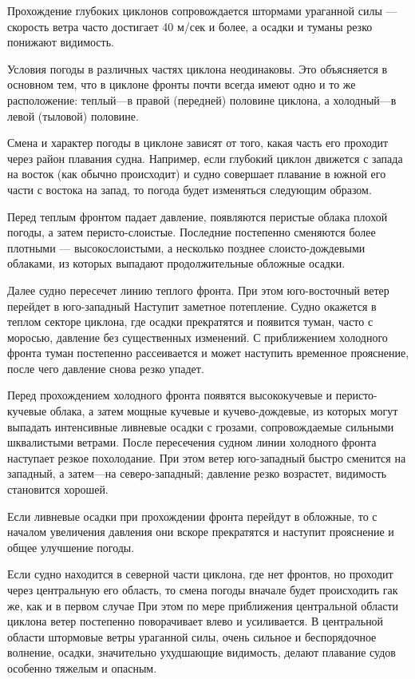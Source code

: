 Прохождение глубоких циклонов сопровождается штормами ураганной силы — скорость ветра часто достигает 40 м/сек и более, а осадки и туманы резко понижают видимость.

Условия погоды в различных частях циклона неодинаковы. Это объясняется в основном тем, что в циклоне фронты почти всегда имеют одно и то же расположение: теплый—в правой (передней) половине циклона, а холодный—в левой (тыловой) половине.

Смена и характер погоды в циклоне зависят от того, какая часть его проходит через район плавания судна. Например, если глубокий циклон движется с запада на восток (как обычно происходит) и судно совершает плавание в южной его части с востока на запад, то погода будет изменяться следующим образом.

Перед теплым фронтом падает давление, появляются перистые облака плохой погоды, а затем перисто-слоистые. Последние постепенно сменяются более плотными — высокослоистыми, а несколько позднее слоисто-дождевыми облаками, из которых выпадают продолжительные обложные осадки.

Далее судно пересечет линию теплого фронта. При этом юго-восточный ветер перейдет в юго-западный Наступит заметное потепление. Судно окажется в теплом секторе циклона, где осадки прекратятся и появится туман, часто с моросью, давление без существенных изменений. С приближением холодного фронта туман постепенно рассеивается и может наступить временное прояснение, после чего давление снова резко упадет.

Перед прохождением холодного фронта появятся высококучевые и перисто-кучевые облака, а затем мощные кучевые и кучево-дождевые, из которых могут выпадать интенсивные ливневые осадки с грозами, сопровождаемые сильными шквалистыми ветрами. После пересечения судном линии холодного фронта наступает резкое похолодание. При этом ветер юго-западный быстро сменится на западный, а затем—на северо-западный; давление резко возрастет, видимость становится хорошей.

Если ливневые осадки при прохождении фронта перейдут в обложные, то с началом увеличения давления они вскоре прекратятся и наступит прояснение и общее улучшение погоды.

Если судно находится в северной части циклона, где нет фронтов, но проходит через центральную его область, то смена погоды вначале будет происходить гак же, как и в первом случае При этом по мере приближения центральной области циклона ветер постепенно поворачивает влево и усиливается. В центральной области штормовые ветры ураганной силы, очень сильное и беспорядочное волнение, осадки, значительно ухудшающие видимость, делают плавание судов особенно тяжелым и опасным.

